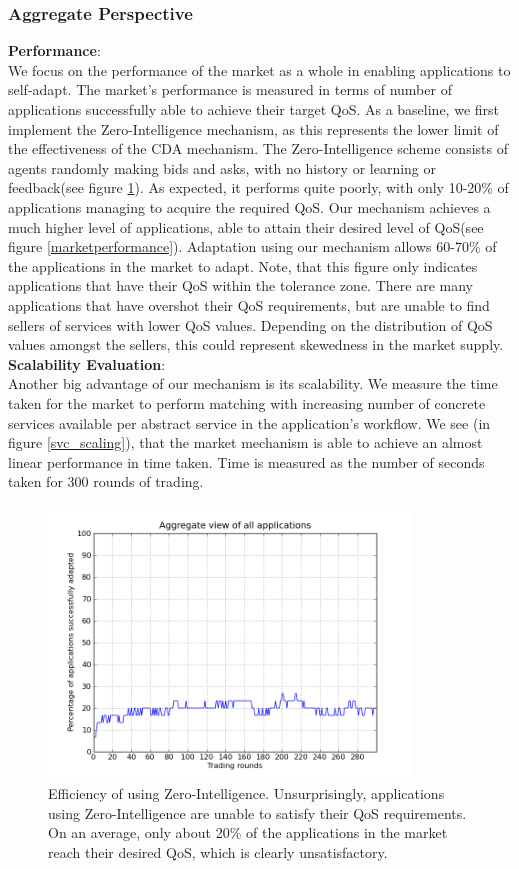\documentclass[10pt,journal,compsoc]{IEEEtran}
\begin{document}
\subsubsection{Aggregate Perspective}
\textbf{Performance}:\\
We focus on the performance of the market as a whole in enabling applications to self-adapt. The market's performance is measured in terms of number of applications successfully able to achieve their target QoS. As a baseline, we first implement the Zero-Intelligence mechanism, as this represents the lower limit of the effectiveness of the CDA mechanism. The Zero-Intelligence scheme consists of agents randomly making bids and asks, with no history or learning or feedback(see figure \ref{pure_random_strategy}). As expected, it performs quite poorly, with only 10-20\% of applications managing to acquire the required QoS. Our mechanism achieves a much higher level of applications, able to attain their desired level of QoS(see figure \ref{marketperformance}). Adaptation using our mechanism allows 60-70\% of the applications in the market to adapt. Note, that this figure only indicates applications that have their QoS within the tolerance zone. There are many applications that have overshot their QoS requirements, but are unable to find sellers of services with lower QoS values. Depending on the distribution of QoS values amongst the sellers, this could represent skewedness in the market supply.\\
\textbf{Scalability Evaluation}:\\    
Another big advantage of our mechanism is its scalability. We measure the time taken for the market to perform matching with increasing number of concrete services available per abstract service in the application's workflow.  We see (in figure \ref{svc_scaling}), that the market mechanism is able to achieve an almost linear performance in time taken. Time is measured as the number of seconds taken for 300 rounds of trading.\\
\begin{figure}
    \includegraphics[width=3.8in]{graphs/efficiency-of-zi.png}
    \caption{Efficiency of using Zero-Intelligence. Unsurprisingly, applications using Zero-Intelligence are unable to satisfy their QoS requirements. On an average, only about 20\% of the applications in the market reach their desired QoS, which is clearly unsatisfactory.}
    \label{pure_random_strategy}
\end{figure}
\end{document}
